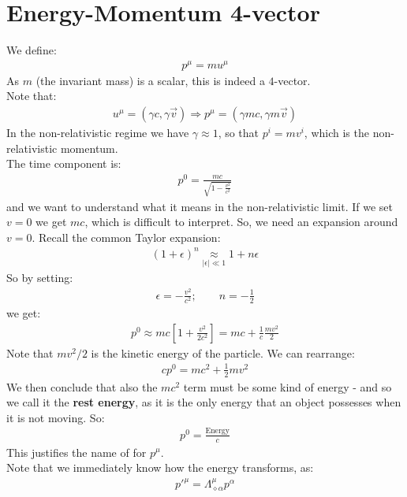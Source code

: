 \documentclass[../template.tex]{subfiles}
\begin{document}
\section{Energy-Momentum 4-vector}
We define:
\begin{align*}
    p^\mu = m u^\mu
\end{align*}
As $m$ (the invariant mass) is a scalar, this is indeed a $4$-vector.\\
Note that:
\begin{align*}
    u^\mu = (\gamma c , \gamma \vec{v}) \Rightarrow p^\mu= (\gamma m c, \gamma m \vec{v}) 
\end{align*}
In the non-relativistic regime we have $\gamma \approx 1$, so that $p^i = mv^i$, which is the non-relativistic momentum.\\
The time component is:
\begin{align*}
    p^0 = \frac{mc}{\sqrt{1-\frac{v^2}{c^2} }} 
\end{align*}  
and we want to understand what it means in the non-relativistic limit. If we set $v=0$ we get $mc$, which is difficult to interpret. So, we need an expansion around $v=0$. Recall the common Taylor expansion:
\begin{align*}
    (1+\epsilon)^n \underset{|\epsilon| \ll 1}{\approx}  1+ n \epsilon
\end{align*} 
So by setting:
\begin{align*}
    \epsilon = -\frac{v^2}{c^2}; \qquad n=-\frac{1}{2}  
\end{align*}
we get:
\begin{align*}
    p^0 \approx mc \left[1+\frac{v^2}{2c^2} \right] = mc + \frac{1}{c} \frac{mv^2}{2}  
\end{align*}
Note that $mv^2/2$ is the kinetic energy of the particle. We can rearrange:
\begin{align*}
    cp^0 = mc^2 + \frac{1}{2} mv^2 
\end{align*} 
We then conclude that also the $mc^2$ term must be some kind of energy - and so we call it the \textbf{rest energy}, as it is the only energy that an object possesses when it is not moving. So:
\begin{align*}
    p^0 = \frac{\text{Energy}}{c} 
\end{align*}  
This justifies the name of  for $p^\mu$.\\

Note that we immediately know how the energy transforms, as:
\begin{align*}
    p'^\mu = \Lambda^\mu_{\diamond \alpha}p^\alpha
\end{align*}
\end{document}
